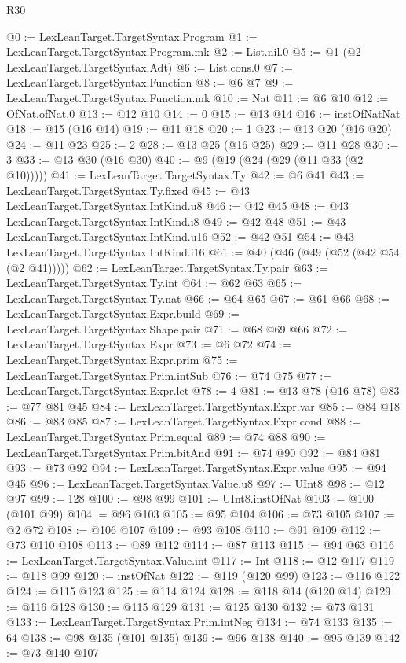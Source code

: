 \begin{lexlean}{R30}
\begin{coremodule}
{{{{{@0 := LexLeanTarget.TargetSyntax.Program
@1 := LexLeanTarget.TargetSyntax.Program.mk
@2 := List.nil.{0}
@5 := @1 (@2 LexLeanTarget.TargetSyntax.Adt)
@6 := List.cons.{0}
@7 := LexLeanTarget.TargetSyntax.Function
@8 := @6 @7
@9 := LexLeanTarget.TargetSyntax.Function.mk
@10 := Nat
@11 := @6 @10
@12 := OfNat.ofNat.{0}
@13 := @12 @10
@14 := 0
@15 := @13 @14
@16 := instOfNatNat
@18 := @15 (@16 @14)
@19 := @11 @18
@20 := 1
@23 := @13 @20 (@16 @20)
@24 := @11 @23
@25 := 2
@28 := @13 @25 (@16 @25)
@29 := @11 @28
@30 := 3
@33 := @13 @30 (@16 @30)
@40 := @9 (@19 (@24 (@29 (@11 @33 (@2 @10)))))
@41 := LexLeanTarget.TargetSyntax.Ty
@42 := @6 @41
@43 := LexLeanTarget.TargetSyntax.Ty.fixed
@45 := @43 LexLeanTarget.TargetSyntax.IntKind.u8
@46 := @42 @45
@48 := @43 LexLeanTarget.TargetSyntax.IntKind.i8
@49 := @42 @48
@51 := @43 LexLeanTarget.TargetSyntax.IntKind.u16
@52 := @42 @51
@54 := @43 LexLeanTarget.TargetSyntax.IntKind.i16
@61 := @40 (@46 (@49 (@52 (@42 @54 (@2 @41)))))
@62 := LexLeanTarget.TargetSyntax.Ty.pair
@63 := LexLeanTarget.TargetSyntax.Ty.int
@64 := @62 @63
@65 := LexLeanTarget.TargetSyntax.Ty.nat
@66 := @64 @65
@67 := @61 @66
@68 := LexLeanTarget.TargetSyntax.Expr.build
@69 := LexLeanTarget.TargetSyntax.Shape.pair
@71 := @68 @69 @66
@72 := LexLeanTarget.TargetSyntax.Expr
@73 := @6 @72
@74 := LexLeanTarget.TargetSyntax.Expr.prim
@75 := LexLeanTarget.TargetSyntax.Prim.intSub
@76 := @74 @75
@77 := LexLeanTarget.TargetSyntax.Expr.let
@78 := 4
@81 := @13 @78 (@16 @78)
@83 := @77 @81 @45
@84 := LexLeanTarget.TargetSyntax.Expr.var
@85 := @84 @18
@86 := @83 @85
@87 := LexLeanTarget.TargetSyntax.Expr.cond
@88 := LexLeanTarget.TargetSyntax.Prim.equal
@89 := @74 @88
@90 := LexLeanTarget.TargetSyntax.Prim.bitAnd
@91 := @74 @90
@92 := @84 @81
@93 := @73 @92
@94 := LexLeanTarget.TargetSyntax.Expr.value
@95 := @94 @45
@96 := LexLeanTarget.TargetSyntax.Value.u8
@97 := UInt8
@98 := @12 @97
@99 := 128
@100 := @98 @99
@101 := UInt8.instOfNat
@103 := @100 (@101 @99)
@104 := @96 @103
@105 := @95 @104
@106 := @73 @105
@107 := @2 @72
@108 := @106 @107
@109 := @93 @108
@110 := @91 @109
@112 := @73 @110 @108
@113 := @89 @112
@114 := @87 @113
@115 := @94 @63
@116 := LexLeanTarget.TargetSyntax.Value.int
@117 := Int
@118 := @12 @117
@119 := @118 @99
@120 := instOfNat
@122 := @119 (@120 @99)
@123 := @116 @122
@124 := @115 @123
@125 := @114 @124
@128 := @118 @14 (@120 @14)
@129 := @116 @128
@130 := @115 @129
@131 := @125 @130
@132 := @73 @131
@133 := LexLeanTarget.TargetSyntax.Prim.intNeg
@134 := @74 @133
@135 := 64
@138 := @98 @135 (@101 @135)
@139 := @96 @138
@140 := @95 @139
@142 := @73 @140 @107
}}}}}
\end{coremodule}
\end{lexlean}
